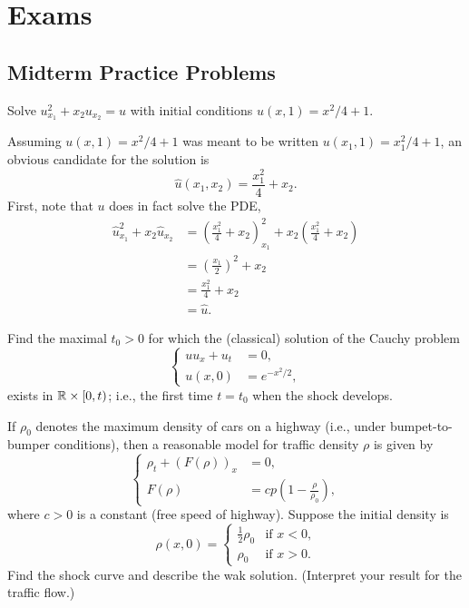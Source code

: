 \section{Exams}
\subsection{Midterm Practice Problems}
\begin{problem}
  Solve \(u_{x_1}^2+x_2u_{x_2}=u\) with initial conditions
  \(u(x,1)=x^2/4+1\).
\end{problem}
\begin{solution*}
  Assuming \(u(x,1)=x^2/4+1\) was meant to be written
  \(u(x_1,1)=x_1^2/4+1\), an obvious candidate for the solution is
  \[
    \hat u(x_1,x_2)=\frac{x_1^2}{4}+x_2.
  \]
  First, note that \(u\) does in fact solve the PDE,
  \begin{align*}
    \hat u_{x_1}^2+x_2\hat u_{x_2}
    &=\left(\frac{x_1^2}{4}+x_2\right)_{x_1}^2
    +x_2\left(\frac{x_1^2}{4}+x_2\right)\\
    &=\left(\frac{x_1}{2}\right)^2+x_2\\
    &=\frac{x_1^2}{4}+x_2\\
    &=\hat u.
  \end{align*}
\end{solution*}

\begin{problem}
  Find the maximal \(t_0>0\) for which the (classical) solution of the
  Cauchy problem
  \[
    \left\{
      \begin{aligned}
        uu_x+u_t&=0,\\
        u(x,0)&=e^{-x^2/2},
      \end{aligned}
    \right.
  \]
  exists in \(\mathbb{R}\times[0,t)\); i.e., the first time \(t=t_0\) when the
  shock develops.
\end{problem}
\begin{solution*}
\end{solution*}

\begin{problem}
  If \(\rho_0\) denotes the maximum density of cars on a highway (i.e.,
  under bumpet-to-bumper conditions), then a reasonable model for traffic
  density \(\rho\) is given by
  \[
     \left\{
       \begin{aligned}
         \rho_t+(F(\rho))_x&=0,\\
         F(\rho)&=cp\left(1-\frac{\rho}{\rho_0}\right),
      \end{aligned}
    \right.
  \]
  where \(c>0\) is a constant (free speed of highway). Suppose the initial
  density is
  \[
    \rho(x,0)=
    \begin{cases}
      \frac{1}{2}\rho_0&\text{if \(x<0\),}\\
      \rho_0&\text{if \(x>0\).}
    \end{cases}
  \]
  Find the shock curve and describe the wak solution. (Interpret your
  result for the traffic flow.)
\end{problem}
\begin{solution*}
\end{solution*}

